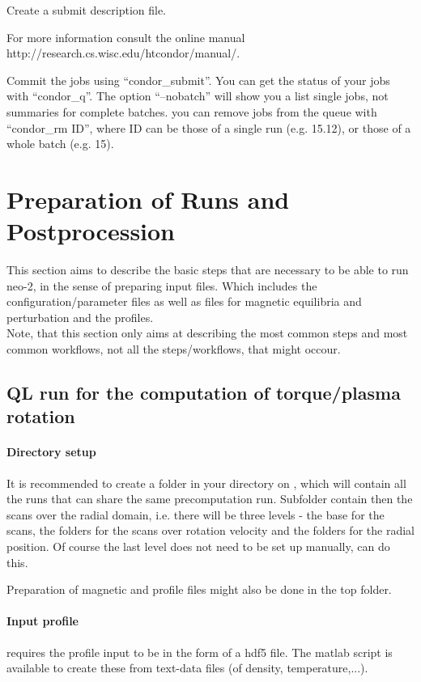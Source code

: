 Create a submit description file.

For more information consult the online manual http://research.cs.wisc.edu/htcondor/manual/.

Commit the jobs using ``condor\_submit''.
You can get the status of your jobs with ``condor\_q''. The option
``--nobatch'' will show you a list single jobs, not summaries for
complete batches.
you can remove jobs from the queue with ``condor\_rm ID'', where ID can
be those of a single run (e.g. 15.12), or those of a whole batch (e.g.
15).

\section{Preparation of Runs and Postprocession}
This section aims to describe the basic steps that are necessary to be
able to run neo-2, in the sense of preparing input files. Which includes
the configuration/parameter files as well as files for magnetic
equilibria and perturbation and the profiles.\\
Note, that this section only aims at describing the most common steps
and most common workflows, not all the steps/workflows, that might
occour.

\subsection{QL run for the computation of torque/plasma rotation}

\paragraph{Directory setup}
It is recommended to create a folder in your directory on ,
which will contain all the runs that can share the same precomputation
run. Subfolder contain then the scans over the radial domain, i.e. there
will be three levels - the base for the scans, the folders for the scans
over rotation velocity and the folders for the radial position. Of
course the last level does not need to be set up manually, \neotwo can
do this.

Preparation of magnetic and profile files might also be done in the top
folder.

\paragraph{Input profile}
\neotwo requires the profile input to be in the form of a hdf5 file. The
matlab script  is available to create
these from text-data files (of density, temperature,...).

